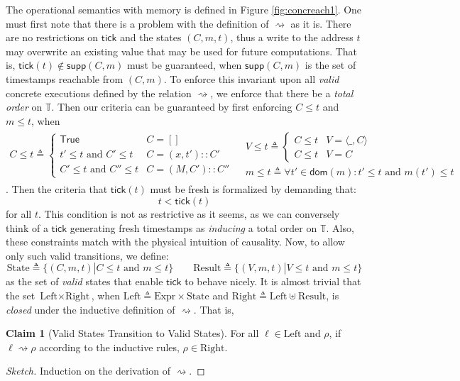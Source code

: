 \documentclass{article}
\theoremstyle{definition}
\newtheorem{clm}{Claim}[section]
\newcommand*{\cons}{::}
\newcommand*{\Expr}{\text{Expr}}
\newcommand*{\Time}{\mathbb{T}}
\newcommand*{\Left}{\text{Left}}
\newcommand*{\Right}{\text{Right}}
\newcommand*{\mem}{m}
\newcommand*{\State}{\text{State}}
\newcommand*{\Result}{\text{Result}}
\newcommand*{\semarrow}{\rightsquigarrow}
\newcommand*{\tick}{\mathsf{tick}}
\begin{document}
The operational semantics with memory is defined in Figure \ref{fig:concreach1}.
One must first note that there is a problem with the definition of $\semarrow$ as it is.
There are no restrictions on $\tick$ and the states $(C,\mem,t)$, thus a write to the address $t$ may overwrite an existing value that may be used for future computations.
That is, $\tick(t)\not\in\mathsf{supp}(C,\mem)$ must be guaranteed, when $\mathsf{supp}(C,\mem)$ is the set of timestamps reachable from $(C,\mem)$.
To enforce this invariant upon all \emph{valid} concrete executions defined by the relation $\semarrow$, we enforce that there be a \emph{total order} on $\Time$.
Then our criteria can be guaranteed by first enforcing $C\le t$ and $\mem\le t$, when
\[
  \begin{array}{cc}
    C \le  t\triangleq
    \begin{cases}
      \mathsf{True}              & C=[]              \\
      t' \le  t\text{ and } C' \le  t  & C=(x,t')\cons C'  \\
      C' \le  t\text{ and } C'' \le  t & C=(M,C')\cons C''
    \end{cases}
     &
    \begin{array}{l}
      V \le  t\triangleq
      \begin{cases}
        C \le  t & V=\langle\_,C\rangle \\
        C \le  t & V=C
      \end{cases} \\
      \mem \le  t\triangleq\forall t'\in\mathsf{dom}(\mem):t'\le t\text{ and }\mem(t') \le  t
    \end{array}
  \end{array}
\]
. Then the criteria that $\tick(t)$ must be fresh is formalized by demanding that:
\[t < \tick(t)\]
for all $t$.
This condition is not as restrictive as it seems, as we can conversely think of a $\tick$ generating fresh timestamps as \emph{inducing} a total order on $\Time$.
Also, these constraints match with the physical intuition of causality.
Now, to allow only such valid transitions, we define:
\[
  \State\triangleq\{(C,\mem,t)|C\le t\text{ and }\mem\le t\}\qquad
  \Result\triangleq\{(V,\mem,t)|V\le t\text{ and }\mem\le t\}
\]
as the set of \emph{valid} states that enable $\tick$ to behave nicely.
It is almost trivial that the set $\Left\times\Right$, when $\Left\triangleq\Expr\times\State$ and $\Right\triangleq\Left\uplus\Result$, is \emph{closed} under the inductive definition of $\semarrow$.
That is,
\begin{clm}[Valid States Transition to Valid States]
  For all $\ell\in\Left$ and $\rho$, if $\ell\semarrow\rho$ according to the inductive rules, $\rho\in\Right$.
\end{clm}
\begin{proof}[Sketch]
  Induction on the derivation of $\semarrow$.
\end{proof}
\end{document}
